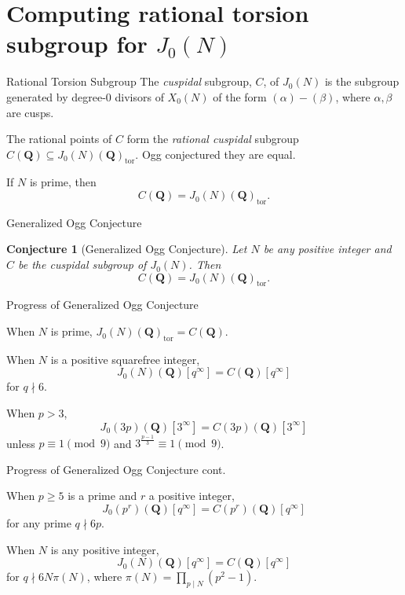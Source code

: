 \documentclass{beamer}
\newtheorem{conjecture}[theorem]{Conjecture}
\newcommand{\QQ}{\mathbf{Q}}
\newcommand{\tor}{\mathrm{tor}}
\begin{document}
\section{Computing rational torsion subgroup for $J_0(N)$}


\begin{frame}{Rational Torsion Subgroup}
    The \emph{cuspidal} subgroup, $C$, of $J_0(N)$ is the subgroup generated by
    degree-0 divisors of $X_0(N)$ of the form $(\alpha)-(\beta)$, where
    $\alpha,\beta$ are cusps.

    The rational points of $C$ form the \emph{rational cuspidal} subgroup
    $C(\QQ)\subseteq J_0(N)(\QQ)_\tor$. Ogg conjectured they are equal.

    \begin{theorem}[Mazur '77]
        If $N$ is prime, then
        \[
            C(\QQ)=J_0(N)(\QQ)_\tor.
        \]
    \end{theorem}
\end{frame}

\begin{frame}{Generalized Ogg Conjecture}
    \begin{conjecture}[Generalized Ogg Conjecture]
        Let $N$ be any positive integer and $C$ be the cuspidal subgroup of
        $J_0(N)$. Then
        \[
            C(\QQ) = J_0(N)(\QQ)_\tor.
        \]
    \end{conjecture}
\end{frame}

\begin{frame}{Progress of Generalized Ogg Conjecture}
    \begin{theorem}[Mazur '77]
        When $N$ is prime, $J_0(N)(\QQ)_\tor =C(\QQ)$.
    \end{theorem}
    \begin{theorem}[Ohta '14]
        When $N$ is a positive squarefree integer,
        \[
            J_0(N)(\QQ)[q^\infty]=C(\QQ)[q^\infty]
        \]
        for $q\nmid 6$.
    \end{theorem}
    \begin{theorem}[Yoo '15]
        When $p>3$,
        \[
            J_0(3p)(\QQ)[3^\infty] = C(3p)(\QQ)[3^\infty]
        \]
        unless $p\equiv 1 \pmod{9}$ and $3^{\frac{p-1}{3}} \equiv 1
        \pmod{9}$.
    \end{theorem}
\end{frame}

\begin{frame}{Progress of Generalized Ogg Conjecture cont.}
    \begin{theorem}[Ling '97]
        When $p\geq 5$ is a prime and $r$ a positive integer,
        \[
            J_0(p^r)(\QQ)[q^\infty] = C(p^r)(\QQ)[q^\infty]
        \]
        for any prime $q\nmid 6p$.
    \end{theorem}
    \begin{theorem}[Ren '18]
        When $N$ is any positive integer,
        \[
            J_0(N)(\QQ)[q^\infty]=C(\QQ)[q^\infty]
        \]
        for $q\nmid 6N\pi(N)$, where $\pi(N) = \prod_{p\mid N}
        (p^2-1)$.
    \end{theorem}
\end{frame}
\end{document}
